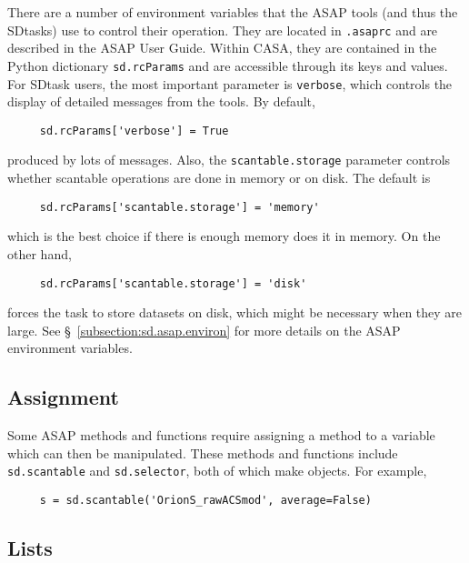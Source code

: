 There are a number of environment variables that the ASAP tools
(and thus the SDtasks) use to control their operation.
They are located in {\tt .asaprc} and are described in the ASAP User Guide.
Within CASA, they are contained in the
Python dictionary {\tt sd.rcParams} and are accessible through
its keys and values.  For SDtask users, the most important parameter is
{\tt verbose}, which controls the display of detailed
messages from the tools. By default,
\small
\begin{verbatim}
     sd.rcParams['verbose'] = True
\end{verbatim}
\normalsize
produced by lots of messages.  Also, the {\tt scantable.storage}
parameter controls whether scantable operations are done
in memory or on disk.  The default is  
\small
\begin{verbatim}
     sd.rcParams['scantable.storage'] = 'memory'  
\end{verbatim}
\normalsize
which is the best choice if there is enough memory
does it in memory.  On the other hand,
\small
\begin{verbatim}
     sd.rcParams['scantable.storage'] = 'disk'
\end{verbatim}
\normalsize
forces the task to store datasets on disk, which might be necessary when they are large.
See \S~\ref{subsection:sd.asap.environ} for more details on the
ASAP environment variables.

\subsection{Assignment}
\label{section:sd.intro.ass}

Some ASAP methods and functions require assigning a method
to a variable which can then be manipulated.  These methods and functions include
{\tt sd.scantable} and {\tt sd.selector}, both of which make objects.
For example,
\small
\begin{verbatim}
     s = sd.scantable('OrionS_rawACSmod', average=False) 
\end{verbatim}
\normalsize

\subsection{Lists}
\label{section:sd.intro.lists}

